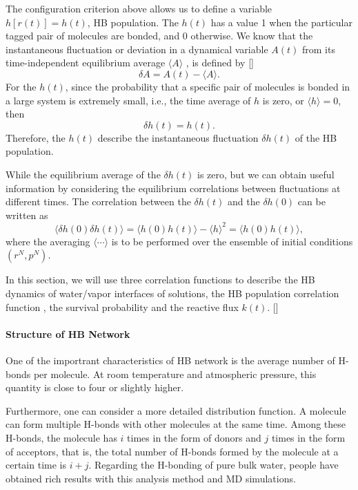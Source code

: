 The configuration criterion above allows us to define a variable $h[r(t)] = h(t)$, HB population. 
The $h(t)$ has a value 1 when the particular tagged pair of molecules are bonded, and 0 otherwise. 
We know that the instantaneous fluctuation or deviation in a dynamical variable $A(t)$ from its time-independent equilibrium average $\langle A\rangle$ , 
is defined by [\cite{DC87}] 
$$
\delta A = A(t) - \langle A\rangle.
$$
For the $h(t)$, since the probability that a specific pair of molecules is bonded in a large system is extremely small, i.e., 
the time average of $h$ is zero, or  
$\langle h \rangle = 0$,
then
$$
\delta h(t) = h(t).
$$
Therefore, the $h(t)$ describe the instantaneous fluctuation $\delta h(t)$  of the HB population.  

While the equilibrium average of the $\delta h(t)$ is zero, but we can obtain useful information by considering the equilibrium 
correlations between fluctuations at different times. The correlation between the $\delta h(t)$ and the $\delta h(0)$ can be written as 
$$
\langle \delta h(0) \delta h(t)\rangle = \langle h(0)h(t)\rangle-\langle h \rangle^2 = \langle h(0)h(t)\rangle,
$$
where the averaging $\langle\cdots\rangle$ is to be performed over the ensemble of initial conditions $(r^N, p^N)$.


In this section, we will use three correlation functions to describe the HB dynamics of water/vapor interfaces of solutions,
the HB population correlation function \CHB, the survival probability \SHB and the reactive flux $k(t)$. [\cite{DCR83}]

\paragraph{Structure of HB Network}
One of the importrant characteristics of HB network is the average number of H-bonds per molecule. 
At room temperature and atmospheric pressure, this quantity is close to four or slightly higher. \cite{Malenkov2006} 

Furthermore, one can consider a more detailed distribution function. A molecule can form multiple H-bonds with other molecules at the same time.
 Among these H-bonds, the molecule has $i$ times in the form of donors and $j$ times in the form of acceptors, 
that is, the total number of H-bonds formed by the molecule at a certain time is $i+j$.
Regarding the H-bonding of pure bulk water, people have obtained rich results with this analysis method and MD simulations. \cite{Malenkov1990,Malenkov2006}

